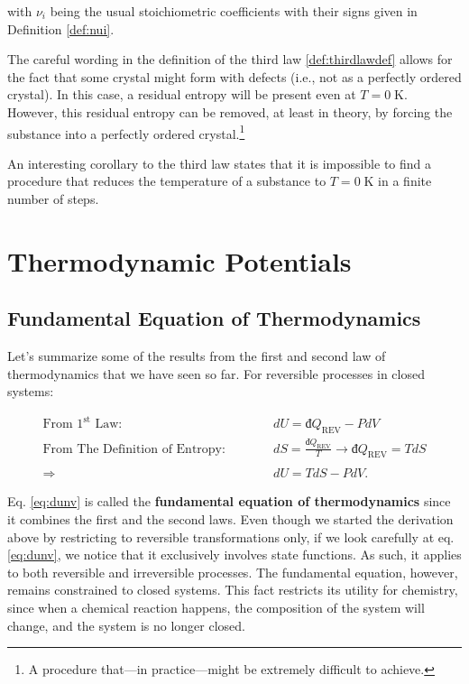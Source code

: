 \documentclass[
  9pt,
]{extbook}
\theoremstyle{definition}
\theoremstyle{definition}
\theoremstyle{definition}
\theoremstyle{remark}
\begin{document}
with \(\nu_i\) being the usual stoichiometric coefficients with their signs given in Definition \ref{def:nui}.

The careful wording in the definition of the third law \ref{def:thirdlawdef} allows for the fact that some crystal might form with defects (i.e., not as a perfectly ordered crystal). In this case, a residual entropy will be present even at \(T=0 \; \text{K}\). However, this residual entropy can be removed, at least in theory, by forcing the substance into a perfectly ordered crystal.\footnote{A procedure that---in practice---might be extremely difficult to achieve.}

An interesting corollary to the third law states that it is impossible to find a procedure that reduces the temperature of a substance to \(T=0 \; \text{K}\) in a finite number of steps.

\hypertarget{Potentials}{%
\chapter{Thermodynamic Potentials}\label{Potentials}}

\hypertarget{fundeq}{%
\section{Fundamental Equation of Thermodynamics}\label{fundeq}}

Let's summarize some of the results from the first and second law of thermodynamics that we have seen so far. For reversible processes in closed systems:

\begin{equation}
\begin{aligned}
\text{From 1}^{\text{st}} \text{ Law:} \qquad \quad & dU = đQ_{\mathrm{REV}}-PdV \\
\text{From The Definition of Entropy:} \qquad \quad & dS = \frac{đQ_{\mathrm{REV}}}{T} \rightarrow đQ_{\mathrm{REV}} = TdS \\
\\
\Rightarrow \quad & dU = TdS - PdV.
\end{aligned}
\label{eq:dunv}
\end{equation}

Eq. \eqref{eq:dunv} is called the \textbf{fundamental equation of thermodynamics} since it combines the first and the second laws. Even though we started the derivation above by restricting to reversible transformations only, if we look carefully at eq. \eqref{eq:dunv}, we notice that it exclusively involves state functions. As such, it applies to both reversible and irreversible processes. The fundamental equation, however, remains constrained to closed systems. This fact restricts its utility for chemistry, since when a chemical reaction happens, the composition of the system will change, and the system is no longer closed.
\end{document}
